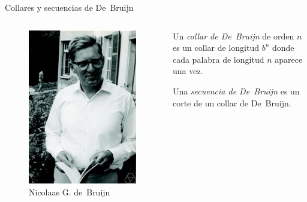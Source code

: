 \documentclass[spanish,xcolor={table}]{beamer}
\begin{document}
\begin{frame}{Collares y secuencias de De~Bruijn}

\begin{columns}
  \begin{figure}
    \includegraphics[width=\textwidth]{de-bruijn.jpg}
    \caption{Nicolaas G. de~Bruijn}
  \end{figure}

  \begin{definition}
    Un \emph{collar de De~Bruijn} de orden $n$ es un collar de longitud
    $b^n$ donde cada palabra de longitud $n$ aparece una vez.

    \medskip

    Una \emph{secuencia de De~Bruijn} es un corte de un collar de De~Bruijn.
  \end{definition}
  

\end{columns}
\end{frame}
\end{document}
